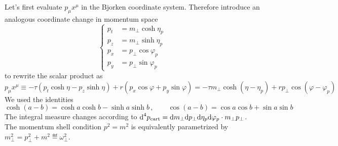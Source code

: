 Let's first evaluate $p_\mu x^\mu$ in the Bjorken coordinate system. Therefore introduce an analogous coordinate change in momentum space
\begin{equation}
    \left\{\begin{split}
        p_t&=m_\perp\cosh\eta_p\\
        p_z&=m_\perp\sinh\eta_p\\
        p_x&=p_\perp\cos\varphi_p\\
        p_y&=p_\perp\sin\varphi_p
    \end{split}\right.
\end{equation}
to rewrite the scalar product as
\begin{equation}
    p_\mu x^\mu\equiv-\tau(p_t\cosh\eta-p_z\sinh\eta)+r(p_x\cos\varphi+p_y\sin\varphi)=-\tau m_\perp\cosh(\eta-\eta_p)+r p_\perp\cos(\varphi-\varphi_p)
\end{equation}
We used the identities
\begin{equation}
    \cosh(a-b)=\cosh a\cosh b-\sinh a\sinh b\,,\qquad\cos(a-b)=\cos a\cos b+\sin a\sin b
\end{equation}
The integral measure changes according to $\text{d}^4p_{\text{cart}}=\text{d} m_\perp\text{d} p_\perp\text{d}\eta_p\text{d}\varphi_p\cdot m_\perp p_\perp$. The momentum shell condition $p^2=m^2$ is equivalently parametrized by $m_\perp^2=p_\perp^2+m^2\eqdef \omega_\perp^2$.

